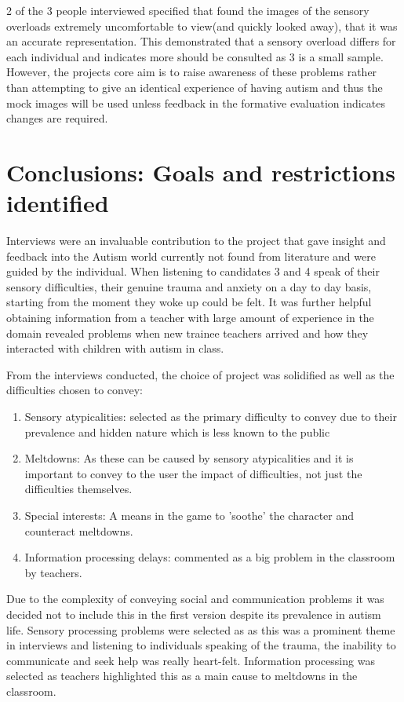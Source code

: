 \documentclass[11pt]{report}
\begin{document}
2 of the 3 people interviewed specified that found the images of the sensory overloads extremely uncomfortable to view(and quickly looked away), that it was an accurate representation. This demonstrated that a sensory overload differs for each individual and indicates more should be consulted as 3 is a small sample. However, the projects core aim is to raise awareness of these problems rather than attempting to give an identical experience of having autism and thus the mock images will be used unless feedback in the formative evaluation indicates changes are required. 


\section{Conclusions: Goals and restrictions identified}
\label{goalsandrestrictions}
Interviews were an invaluable contribution to the project that gave insight and feedback into the Autism world currently not found from literature and were guided by the individual. When listening to candidates 3 and 4 speak of their sensory difficulties, their genuine trauma and anxiety on a day to day basis, starting from the moment they woke up could be felt. It was further helpful obtaining information from a teacher with large amount of experience in the domain revealed problems when new trainee teachers arrived and how they interacted with children with autism in class.  

From the interviews conducted, the choice of project was solidified as well as the difficulties chosen to convey:

\begin{enumerate}
\item Sensory atypicalities: selected as the primary difficulty to convey due to their prevalence and hidden nature which is less known to the public
\item Meltdowns: As these can be caused by sensory atypicalities and it is important to convey to the user the impact of difficulties, not just the difficulties themselves.
\item Special interests: A means in the game to 'soothe' the character and counteract meltdowns.
\item Information processing delays: commented as a big problem in the classroom by teachers.
\end{enumerate}

Due to the complexity of conveying social and communication problems it was decided not to include this in the first version despite its prevalence in autism life. Sensory processing problems were selected as as this was a prominent theme in interviews and listening to individuals speaking of the trauma, the inability to communicate and seek help was really heart-felt. Information processing was selected as teachers highlighted this as a main cause to meltdowns in the classroom. 
\end{document}
